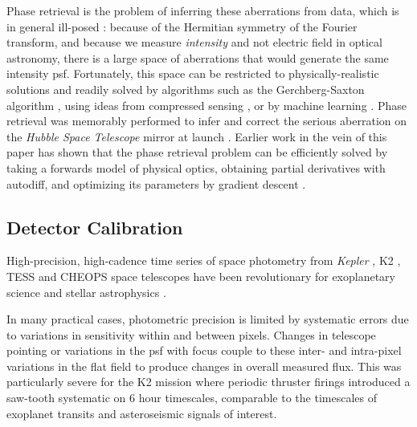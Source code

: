\documentclass[twocolumn]{spie}
\begin{document}
Phase retrieval is the problem of inferring these aberrations from data\cite{schechtman2014}, which is in general ill-posed \cite{barnett2020}: because of the Hermitian symmetry of the Fourier transform, and because we measure \textit{intensity} and not electric field in optical astronomy, there is a large space of aberrations that would generate the same intensity \ac{psf}. Fortunately, this space can be restricted to physically-realistic solutions and readily solved by algorithms such as the Gerchberg-Saxton algorithm \cite{gerchberg1972}, using ideas from compressed sensing \cite{candes2011}, or by machine learning \cite{metzler2018,isil2019,nishizaki2020}.  Phase retrieval was memorably performed to infer and correct the serious aberration on the \textit{Hubble Space Telescope} mirror at launch \cite{hubble_phase_ret}. 
Earlier work in the vein of this paper has shown that the phase retrieval problem can be efficiently solved by taking a forwards model of physical optics, obtaining partial derivatives with autodiff, and optimizing its parameters by gradient descent \cite{jurling_fienup,phase_ret_and_design}.

\subsection{Detector Calibration}

High-precision, high-cadence time series of space photometry from \textit{Kepler} \cite{Borucki2010}, K2 \cite{K2}, TESS \cite{TESS} and CHEOPS \cite{CHEOPS} space telescopes have been revolutionary for exoplanetary science \cite{Zhu2021} and stellar astrophysics \cite{Aerts21,Jackiewicz2021}. 

In many practical cases, photometric precision is limited by systematic errors due to variations in sensitivity within and between pixels. Changes in telescope pointing or variations in the \ac{psf} with focus couple to these inter- and intra-pixel variations in the flat field to produce changes in overall measured flux. This was particularly severe for the K2 mission where periodic thruster firings introduced a saw-tooth systematic on 6 hour timescales, comparable to the timescales of exoplanet transits and asteroseismic signals of interest. 
\end{document}
